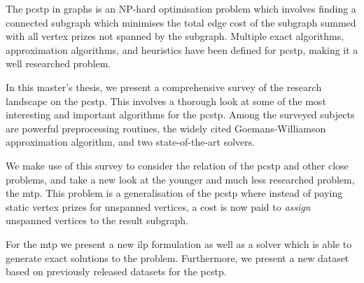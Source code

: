 The \gls{pcstp} in graphs is an NP-hard optimisation problem which involves
finding a connected subgraph which minimises the total edge cost of
the subgraph summed with all vertex prizes not spanned by the subgraph.
Multiple exact algorithms, approximation algorithms, and heuristics have been defined
for \gls{pcstp}, making it a well researched problem.

In this master's thesis, we present a comprehensive survey of the research landscape
on the \gls{pcstp}. This involves a thorough look at some of the most interesting
and important algorithms for the \gls{pcstp}. Among the surveyed subjects are
powerful preprocessing routines, the widely cited Goemans-Williamson approximation
algorithm, and two state-of-the-art solvers.

We make use of this survey to consider the relation of the \gls{pcstp} and other close
 problems, and take a new look at the younger and much less researched problem, the
\gls{mtp}. This problem is a generalisation of the \gls{pcstp} where instead of paying
static vertex prizes for unspanned vertices, a cost is now paid to \textit{assign}
unspanned vertices to the result subgraph.

For the \gls{mtp} we present a new \acrlong{ilp} formulation as well as a solver which
is able to generate exact solutions to the problem. Furthermore, we present a new
dataset based on previously released datasets for the \gls{pcstp}.

